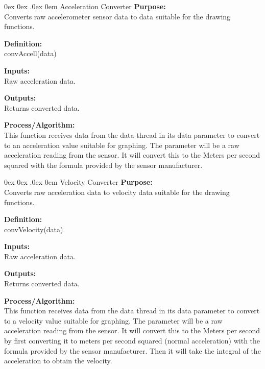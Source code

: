\documentclass[10pt,draftclsnofoot,onecolumn,compsoc]{IEEEtran}
\makeatletter
\renewcommand\paragraph{\@startsection{paragraph}{4}{\z@}%
                                    {0ex \@plus0ex \@minus.0ex}%
                                    {0em}%
                                    {\normalfont\normalsize\bfseries}}
\makeatother
\begin{document}
\paragraph{Acceleration Converter}
{\bf Purpose:} \\
Converts raw accelerometer sensor data to data suitable for the drawing functions.  \par
{\bf Definition:} \\ 
convAccell(data) \par
{\bf Inputs:} \\ Raw acceleration data. \par
{\bf Outputs:} \\ Returns converted data. \par
{\bf Process/Algorithm:} \\
This function receives data from the data thread in its data parameter to convert to an acceleration value suitable for graphing. The parameter will be a raw acceleration reading from the sensor. It will convert this to the Meters per second squared with the formula provided by the sensor manufacturer. \par

\paragraph{Velocity Converter}
{\bf Purpose:} \\
Converts raw acceleration data to velocity data suitable for the drawing functions.  \par
{\bf Definition:} \\ 
convVelocity(data) \par
{\bf Inputs:} \\ Raw acceleration data. \par
{\bf Outputs:} \\ Returns converted data. \par
{\bf Process/Algorithm:} \\
This function receives data from the data thread in its data parameter to convert to a velocity value suitable for graphing. The parameter will be a raw acceleration reading from the sensor. It will convert this to the Meters per second by first converting it to meters per second squared (normal acceleration) with the formula provided by the sensor manufacturer. Then it will take the integral of the acceleration to obtain the velocity.\par
\end{document}
